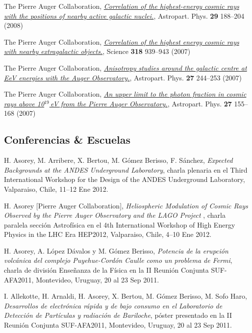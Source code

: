 \documentclass[11pt, a4paper]{article}
\newcommand{\years}[1]{\marginnote{\scriptsize #1}}
\begin{document}
\years{2008}The Pierre Auger Collaboration,
\href{http://dx.doi.org/10.1016/j.astropartphys.2008.01.002}{\emph{Correlation
of the highest-energy cosmic rays with the positions of nearby active galactic
nuclei.}}, Astropart. Phys. {\bf 29} 188--204 (2008)

\years{2007}The Pierre Auger Collaboration,
\href{http://dx.doi.org/10.1126/science.1151124}{\emph{Correlation of the
highest energy cosmic rays with nearby extragalactic objects.}}, Science {\bf
318} 939--943 (2007)

\years{2007}The Pierre Auger Collaboration,
\href{http://dx.doi.org/10.1016/j.astropartphys.2006.11.002}{\emph{Anisotropy
studies around the galactic centre at EeV energies with the Auger
Observatory.}},  Astropart. Phys. {\bf 27} 244--253 (2007)

\years{2007}The Pierre Auger Collaboration,
\href{http://dx.doi.org/10.1016/j.astropartphys.2006.10.004}{\emph{An upper
limit to the photon fraction in cosmic rays above 10$^{19}$\,eV from the Pierre
Auger Observatory.}}, Astropart. Phys. {\bf 27} 155--168 (2007)

\subsection*{Conferencias \& Escuelas}
\noindent

\years{2012} H. Asorey, M. Arribere, X. Bertou, M. Gómez Berisso, F. Sánchez, 
{\emph{Expected Backgrounds at the ANDES Underground Laboratory}}, charla
plenaria en el Third International Workshop for the Design of the ANDES
Underground Laboratory, Valparaiso, Chile, 11--12 Ene 2012.

\years{2012}H. Asorey [Pierre Auger Collaboration], {\emph{Heliospheric
Modulation of Cosmic Rays Observed by the Pierre Auger Observatory and the LAGO
Project}} , charla paralela sección Astrofísica en el 4th International
Workshop of High Energy Physics in the LHC Era HEP2012, Valparaiso, Chile,
4--10 Ene 2012.

\years{2011}H. Asorey, A. López Dávalos y M. Gómez Berisso, {\emph{Potencia de
la erupción volcánica del complejo Puyehue-Cordón Caulle como un problema de
Fermi}}, charla de división Enseñanza de la Física en la II Reunión Conjunta
SUF-AFA2011, Montevideo, Uruguay, 20 al 23 Sep 2011.

\years{2011}I. Allekotte, H. Arnaldi, H. Asorey, X. Bertou, M. Gómez Berisso,
M. Sofo Haro, {\emph{Desarrollos de electrónica rápida y de bajo consumo en el
Laboratorio de Detección de Partículas y radiación de Bariloche}}, póster
presentado en la II Reunión Conjunta SUF-AFA2011, Montevideo, Uruguay, 20 al 23
Sep 2011.
\end{document}
